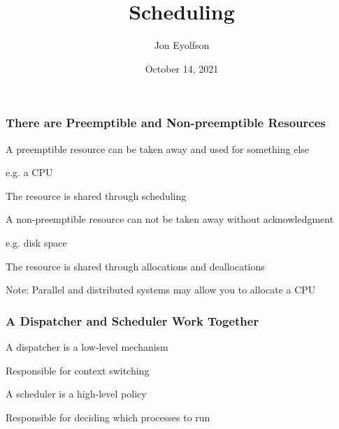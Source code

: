 

\title{Scheduling}
\author{Jon Eyolfson}
\date{October 14, 2021}


  \begin{frame}
    \titlepage
  \end{frame}

  \begin{frame}
    \frametitle{There are Preemptible and Non-preemptible Resources}

    A preemptible resource can be taken away and used for something else

    \hspace{2em} e.g. a CPU

    \vspace{2em}

    The resource is shared through scheduling

    \vspace{4em}

    A non-preemptible resource can not be taken away without acknowledgment

    \hspace{2em} e.g. disk space

    \vspace{2em}

    The resource is shared through allocations and deallocations

    \hspace{2em} Note: Parallel and distributed systems may allow you to allocate a CPU
  \end{frame}

  \begin{frame}
    \frametitle{A Dispatcher and Scheduler Work Together}

    A dispatcher is a low-level mechanism

    \hspace{2em} Responsible for context switching

    \vspace{2em}

    A scheduler is a high-level policy

    \hspace{2em} Responsible for deciding which processes to run
  \end{frame}

